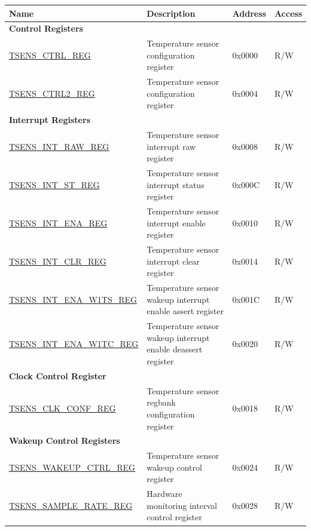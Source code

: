 \begin{longtable}{|p{6cm}|p{7.2cm}|p{1.3cm}|p{1cm}|}
\hline\rowcolor{lightgray}
\textbf{Name} & \textbf{Description} & \textbf{Address} & \textbf{Access} \\ \hline
\endhead

\multicolumn{4}{|l|}{\textbf{Control Registers}} \\ \hline
\hyperref[regdesc:TSENSCTRLREG]{TSENS\_CTRL\_REG}   & Temperature sensor configuration register  & 0x0000 & R/W  \\ \hline
\hyperref[regdesc:TSENSCTRL2REG]{TSENS\_CTRL2\_REG} & Temperature sensor configuration register  & 0x0004 & R/W    \\ \hline

\multicolumn{4}{|l|}{\textbf{Interrupt Registers}} \\ \hline
\hyperref[regdesc:TSENSINTRAWREG]{TSENS\_INT\_RAW\_REG}       & Temperature sensor interrupt raw register      & 0x0008 & R/W  \\ \hline
\hyperref[regdesc:TSENSINTSTREG]{TSENS\_INT\_ST\_REG}         & Temperature sensor interrupt status register   & 0x000C & R/W        \\ \hline
\hyperref[regdesc:TSENSINTENAREG]{TSENS\_INT\_ENA\_REG}       & Temperature sensor interrupt enable register   & 0x0010 & R/W     \\ \hline
\hyperref[regdesc:TSENSINTCLRREG]{TSENS\_INT\_CLR\_REG}       & Temperature sensor interrupt clear register    & 0x0014 & R/W        \\ \hline
\hyperref[regdesc:TSENSINTENAW1TSREG]{TSENS\_INT\_ENA\_W1TS\_REG} & Temperature sensor wakeup interrupt enable assert register   & 0x001C & R/W  \\ \hline
\hyperref[regdesc:TSENSINTENAW1TCREG]{TSENS\_INT\_ENA\_W1TC\_REG} & Temperature sensor wakeup interrupt enable deassert register & 0x0020 & R/W  \\ \hline

\multicolumn{4}{|l|}{\textbf{Clock Control Register}} \\ \hline
\hyperref[regdesc:TSENSCLKCONFREG]{TSENS\_CLK\_CONF\_REG} & Temperature sensor regbank configuration register & 0x0018 & R/W \\ \hline

\multicolumn{4}{|l|}{\textbf{Wakeup Control Registers}} \\ \hline
\hyperref[regdesc:TSENSWAKEUPCTRLREG]{TSENS\_WAKEUP\_CTRL\_REG} & Temperature sensor wakeup control register   & 0x0024 & R/W  \\ \hline
\hyperref[regdesc:TSENSSAMPLERATEREG]{TSENS\_SAMPLE\_RATE\_REG} & Hardware monitoring interval control register & 0x0028 & R/W \\ \hline

\end{longtable}